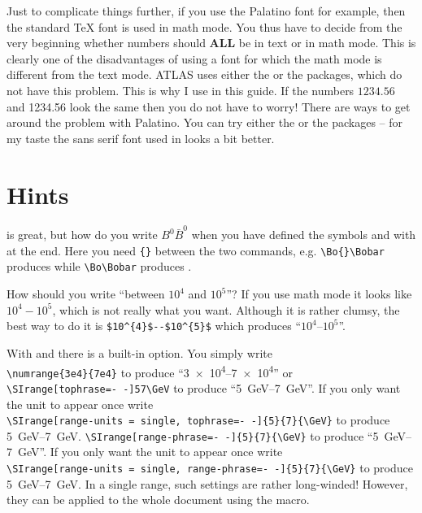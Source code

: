 Just to complicate things further, if you use the Palatino font for
example, then the standard \TeX{} font is used in math mode. You thus
have to decide from the very beginning whether numbers should
\textbf{ALL} be in text or in math mode. This is clearly one of the
disadvantages of using a font for which the math mode is different
from the text mode. ATLAS uses either the  or the
 packages, which do not have this problem. This is
why I use  in this guide. If the numbers
$1234.56$ and 1234.56 look the same then you do not have to
worry! There are ways to get around the problem with Palatino. You can
try either the  or the  packages --
for my taste the sans serif font used in  looks a bit better.


\section{Hints}
\label{sec:tips:hints}

 is great, but how do you write $B^{0}\bar{B}^{0}$ when
you have defined the symbols  and  with
 at the end. Here you need \verb+{}+ between the two
commands, e.g. \verb+\Bo{}\Bobar+ produces \Bo{}\Bobar while
\verb+\Bo\Bobar+ produces \Bo\Bobar.

How should you write \enquote{between $10^{4}$ and $10^{5}$}?
If you use math mode it looks like $10^{4} - 10^{5}$, which is not
really what you want. Although it is rather clumsy, the best way to do
it is \verb+$10^{4}$--$10^{5}$+ which produces
\enquote{$10^{4}$--$10^{5}$}.

With  and  there
is a built-in option. You simply write\\
\verb+\numrange{3e4}{7e4}+
to produce \enquote{\numrange{3e4}{7e4}} or\\
 {%
  \texttt{\textbackslash SIrange[tophrase=-\,-]{5}{7}{\textbackslash GeV}}
  to produce \enquote{\SIrange[tophrase=--]{5}{7}{\GeV}}.
  If you only want the unit to appear once write\\
  \texttt{\textbackslash SIrange[range-units = single, tophrase=-\,-]\{5\}\{7\}\{\textbackslash GeV\}}
  to produce
  \SIrange[trapambigrange=false, tophrase=--]{5}{7}{\GeV}.
}{%
  \texttt{\textbackslash SIrange[range-phrase=-\,-]\{5\}\{7\}\{\textbackslash GeV\}}
  to produce \enquote{\SIrange[range-phrase=--]{5}{7}{\GeV}}.
  If you only want the unit to appear once write\\
  \texttt{\textbackslash SIrange[range-units = single, range-phrase=-\,-]\{5\}\{7\}\{\textbackslash GeV\}}
  to produce
  \SIrange[range-units = single, range-phrase=--]{5}{7}{\GeV}.
}
In a single range, such settings are rather long-winded!
However, they can be applied to the whole
document using the  macro.

